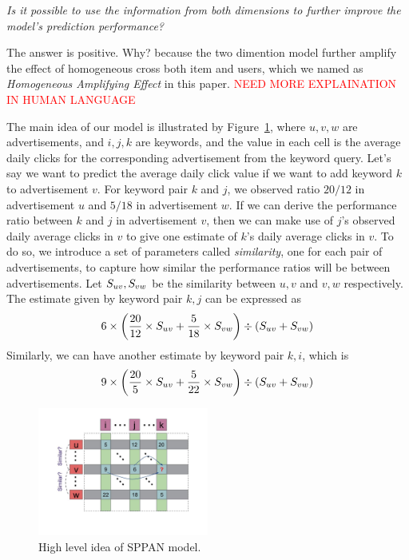 \documentclass[conference,compsoc]{IEEEtran}
\begin{document}
\textit{ Is it possible to use the information from both dimensions to further improve the model's prediction performance? }

The answer is positive. Why?  because the two dimention model further amplify the effect of homogeneous cross both item and users, which we named as  {\it Homogeneous Amplifying Effect} in this paper. \textcolor{red}{NEED MORE EXPLAINATION IN HUMAN LANGUAGE}

The main idea of our model is illustrated by Figure~\ref{fig:sppan-idea}, where $u,v,w$ are advertisements, and $i,j,k$ are keywords, and the value in each cell is the average daily clicks for the corresponding advertisement from the keyword query. 
Let's say we want to predict the average daily click value if we want to add keyword $k$ to advertisement $v$. For keyword pair $k$ and $j$, we observed ratio $20/12$ in advertisement $u$ and $5/18$ in advertisement $w$. If we can derive the performance ratio between $k$ and $j$ in advertisement $v$, then we can make use of $j$'s observed daily average clicks in $v$ to give one estimate of $k$'s daily average clicks in $v$. To do so, we introduce a set of parameters called {\em similarity}, one for each pair of advertisements, to capture how similar the performance ratios will be between advertisements. Let $S_{{u}{v}},S_{{v}{w}}$ be the similarity between $u,v$ and $v,w$ respectively. The estimate given by keyword pair $k,j$ can be expressed as
\[ 6\times \left(\frac{20}{12}\times S_{{u}{v}} + \frac{5}{18}\times S_{{v}{w}} \right)\div \left(S_{{u}{v}} + S_{{v}{w}} \right) \]
Similarly, we can have another estimate by keyword pair $k,i$, which is
\[ 9\times \left(\frac{20}{5}\times S_{{u}{v}} + \frac{5}{22}\times S_{{v}{w}} \right)\div \left(S_{{u}{v}} + S_{{v}{w}} \right) \]

\begin{figure}[!ht]
  \centering
  \includegraphics[width=0.5\textwidth]{figures/example.jpg}
  \caption{High level idea of SPPAN model.}
  \label{fig:sppan-idea}
\end{figure}
\end{document}
